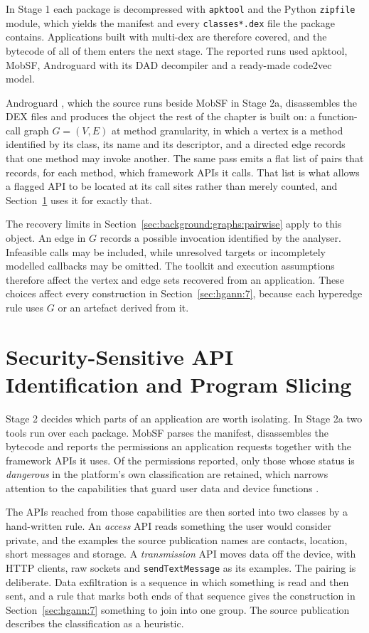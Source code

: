 In Stage 1 each package is decompressed with \texttt{apktool} and the Python \texttt{zipfile}
module, which yields the manifest and every \texttt{classes*.dex} file the package contains.
Applications built with multi-dex are therefore covered, and the bytecode of all of them enters
the next stage. The reported runs used apktool, MobSF, Androguard with its DAD decompiler and a
ready-made code2vec model.

Androguard \cite{desnos2012android}, which the source runs beside MobSF in Stage 2a, disassembles
the DEX files and produces the object the rest of the chapter is built on: a function-call graph
$G = (V, E)$ at method granularity, in which a
vertex is a method identified by its class, its name and its descriptor, and a directed edge
records that one method may invoke another. The same pass emits a flat list of pairs that records,
for each method, which framework APIs it calls. That list is what allows a flagged API to be
located at its call sites rather than merely counted, and Section~\ref{sec:hgann:5} uses it for
exactly that.

The recovery limits in Section~\ref{sec:background:graphs:pairwise} apply to this object.
An edge in $G$ records a possible invocation identified by the analyser. Infeasible calls may
be included, while unresolved targets or incompletely modelled callbacks may be omitted.
The toolkit and execution assumptions therefore affect the vertex and edge sets recovered
from an application. These choices affect every construction in Section~\ref{sec:hgann:7},
because each hyperedge rule uses $G$ or an artefact derived from it.

\section{Security-Sensitive API Identification and Program Slicing}
\label{sec:hgann:5}

Stage 2 decides which parts of an application are worth isolating. In Stage 2a two tools run over
each package. MobSF parses the manifest, disassembles the bytecode and reports the permissions an
application requests together with the framework APIs it uses. Of the permissions reported, only
those whose status is \emph{dangerous} in the platform's own classification are retained, which
narrows attention to the capabilities that guard user data and device functions
\cite{aosp2026permissions}.

The APIs reached from those capabilities are then sorted into two classes by a hand-written rule.
An \emph{access} API reads something the user would consider private, and the examples the source
publication names are contacts, location, short messages and storage. A \emph{transmission} API
moves data off the device, with HTTP clients, raw sockets and \texttt{sendTextMessage} as its
examples. The pairing is deliberate. Data exfiltration is a sequence in which something is read
and then sent, and a rule that marks both ends of that sequence gives the construction in
Section~\ref{sec:hgann:7} something to join into one group. The source publication describes the
classification as a heuristic.

